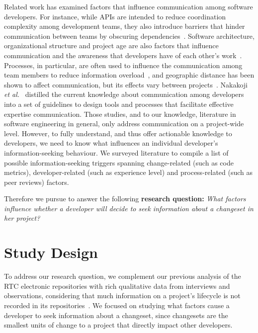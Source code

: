 \documentclass[12pt,oneside]{book}
\begin{document}
Related work has examined factors that influence communication among software developers. For instance, while APIs are intended to reduce coordination complexity among development teams, they also introduce barriers that hinder communication between teams by obscuring dependencies~\cite{souza:cscw:2004,desouza:fse:2004}.
Software architecture, organizational structure and project age are also factors that influence communication and the awareness that developers have of each other's work~\cite{cleidson:tse:2011}. 
Processes, in particular, are often used to influence the communication among team members to reduce information overload~\cite{fussell:cscw:1998}, and geographic distance has been shown to affect communication, but its effects vary between projects~\cite{herbsleb:icse:2001,wolf:spip:2008}.
Nakakoji \emph{et al.}~\cite{nakakoji2010:rdc} distilled the current knowledge about communication among developers into a set of guidelines to design tools and processes that facilitate effective expertise communication.
Those studies, and to our knowledge, literature in software engineering in general, only address communication on a project-wide level. However, to fully understand, and thus offer actionable knowledge to developers, we need to know what influences an individual developer's information-seeking behaviour.
We surveyed literature to compile a list of possible information-seeking triggers spanning change-related (such as code metrics), developer-related (such as experience level) and process-related (such as peer reviews) factors.

Therefore we pursue to answer the following \textbf{research question:}
 \emph{What factors influence whether a developer will decide to seek information about a changeset in her project?}


\section{Study Design}
\label{sec:studydesign}

To address our research question, we complement our previous analysis of the RTC electronic repositories with rich qualitative data from interviews and observations, considering that much information on a project's lifecycle is not recorded in its repositories~\cite{aranda:icse:2009}. We focused on studying what factors cause a developer to seek information about a changeset, since changesets are the smallest units of change to a project that directly impact other developers.
\end{document}
